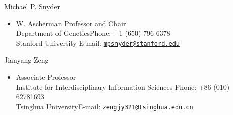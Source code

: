 \documentclass[10pt]{article}
\newenvironment{innerlist}[1][\enskip\textbullet]%
        {\begin{itemize}[#1,leftmargin=*,parsep=0pt,itemsep=0pt,topsep=0pt,partopsep=0pt]}
        {\end{itemize}}
\newcommand{\halfblankline}{\quad\vspace{-0.5\baselineskip}\pagebreak[3]}
\providecommand*\email[1]{\href{mailto:#1}{#1}}
\begin{document}



\halfblankline
%
%

Michael P. Snyder
\begin{innerlist}
\item[] W. Ascherman Professor and Chair\hfill\\
Department of Genetics\hfill {Phone: +1 (650) 796-6378}\\
Stanford University \hfill{E-mail: \texttt{\email{mpsnyder@stanford.edu}}}
\end{innerlist}
\halfblankline

Jianyang Zeng
\begin{innerlist}
\item[] Associate Professor \\
Institute for Interdisciplinary Information Sciences \hfill {Phone: +86 (010) 62781693}\\
Tsinghua University\hfill E-mail: \texttt{\email{zengjy321@tsinghua.edu.cn}}
\end{innerlist}
\end{document}
